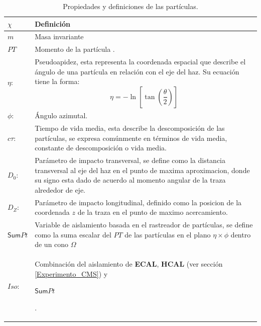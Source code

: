 \begin{table}[!h]
\centering
\begin{tabular}{|p{1.2cm}|p{13cm}|}
\toprule
$\chi$ & Definición\\
\midrule
$m$ & Masa invariante\\
$PT$ & Momento de la partícula%
.\\
$\eta$: & Pseudoapidez, esta representa la coordenada espacial que describe el ángulo de una partícula en relación con el eje del haz. Su ecuación tiene la forma:
\begin{equation}
\eta = -\ln \left[ \tan \left( \dfrac{\theta}{2} \right)\right]
\end{equation}\\[-1cm]
$\phi$: & Ángulo azimutal.\\
$c\tau$: & Tiempo de vida media, esta describe la descomposición de las partículas, se expresa comúnmente en términos de vida media, constante de descomposición o vida media. \\

$D_0$: & Parámetro de impacto transversal, se define como la distancia transversal al eje del haz en el punto de maxima aproximacion, donde su signo esta dado de acuerdo al momento angular de la traza alrededor de eje.\\

$D_Z$: & Parámetro de impacto longitudinal, definido como la posicion de la coordenada $z$ de la traza en el punto de maximo acercamiento.\\
\begin{small}$\textsf{Sum}Pt$\end{small} & Variable de aislamiento basada en el rastreador de partículas, se define como la suma escalar del $PT$ de las partículas en el plano $\eta \times \phi$ dentro de un cono $\Omega$\\
$Iso$: & Combinación del aislamiento de \textbf{ECAL}, \textbf{HCAL} (ver sección \ref{Experimento_CMS}) y \begin{small}$\textsf{Sum}Pt$\end{small}.\\

\bottomrule
\end{tabular}
\caption{Propiedades y definiciones de las partículas.}
\label{propiedades}
\end{table}

